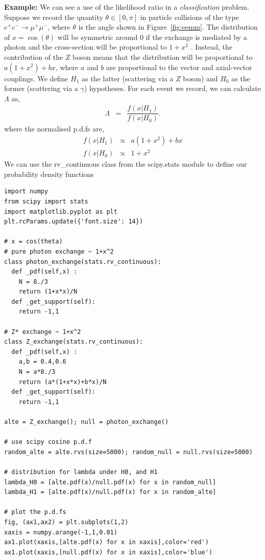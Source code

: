 \begin{tcolorbox}[colback=backblue]
\textbf{Example:} We can see a use of the likelihood ratio in a \emph{classification} problem. Suppose we record the quantity $\theta\in[0,\pi]$ in particle collisions of the type $e^{+}e^{-}\rightarrow \mu^{+}\mu^{-}$, where $\theta$ is the angle shown in Figure~\ref{fig:eemm}. The distribution of $x=\cos(\theta)$ will be symmetric around 0 if the exchange is mediated by a photon and the cross-section will be proportional to $1+x^{2}$ . Instead, the contribution of the $Z$ boson means that  the distribution will be proportional to $a(1+x^{2})+bx$, where $a$ and $b$ are proportional to the vector and axial-vector couplings.  We define $H_1$ as the latter (scattering via a $Z$ boson)  and $H_0$ as the former (scattering via a $\gamma$) hypotheses. For each event we record, we can calculate $\Lambda$ as, 
\begin{eqnarray}
   \Lambda & = & \dfrac{f(x|H_1)}{f(x|H_0)}.
\end{eqnarray}
where the normalised p.d.fs are, 
\begin{eqnarray}
   f(x|H_1) & \propto & a(1+x^{2})+bx \\
   f(x|H_0) & \propto & 1+x^{2} 
\end{eqnarray}
We can use the \textsf{rv\_continuous} class from the \textsf{scipy.stats} module to define our probability density functions  
\begin{lstlisting}[style = Python]
import numpy
from scipy import stats
import matplotlib.pyplot as plt
plt.rcParams.update({'font.size': 14})

# x = cos(theta)
# pure photon exchange ~ 1+x^2
class photon_exchange(stats.rv_continuous):
  def _pdf(self,x) :
    N = 8./3
    return (1+x*x)/N
  def _get_support(self):
    return -1,1

# Z* exchange ~ 1+x^2
class Z_exchange(stats.rv_continuous):
  def _pdf(self,x) :
    a,b = 0.4,0.6
    N = a*8./3
    return (a*(1+x*x)+b*x)/N
  def _get_support(self):
    return -1,1

alte = Z_exchange(); null = photon_exchange()

# use scipy cosine p.d.f
random_alte = alte.rvs(size=5000); random_null = null.rvs(size=5000)

# distribution for lambda under H0, and H1
lambda_H0 = [alte.pdf(x)/null.pdf(x) for x in random_null]
lambda_H1 = [alte.pdf(x)/null.pdf(x) for x in random_alte]

# plot the p.d.fs
fig, (ax1,ax2) = plt.subplots(1,2)
xaxis = numpy.arange(-1,1,0.01)
ax1.plot(xaxis,[alte.pdf(x) for x in xaxis],color='red')
ax1.plot(xaxis,[null.pdf(x) for x in xaxis],color='blue')


\end{lstlisting}
\end{tcolorbox}
